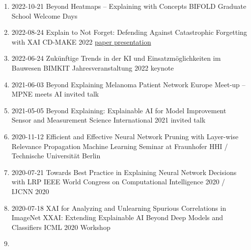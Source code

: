 \documentclass[10pt,a4paper]{article} %
\begin{document}
{
\begin{enumerate}
    \item {}
                    {2022-10-21}
                    {Beyond Heatmaps -- Explaining with Concepts}
                    {BIFOLD Graduate School Welcome Days}
    \item {}
                    {2022-08-24}
                    {Explain to Not Forget: Defending Against Catastrophic Forgetting with XAI                    }
                    {CD-MAKE 2022}
                    {\href{https://link.springer.com/chapter/10.1007/978-3-031-14463-9_1}{paper presentation}}
    \item {}
                    {2022-06-24}
                    {Zukünftige Trends in der KI und Einsatzmöglichkeiten im Bauwesen}
                    {BIMKIT Jahresveranstaltung 2022}
                    {keynote}
    \item {}
                    {2021-06-03}
                    {Beyond Explaining}
                    {Melanoma Patient Network Europe Meet-up -- MPNE meets AI }
                    {invited talk}
    \item {}
                    {2021-05-05}
                    {Beyond Explaining: Explainable AI for Model Improvement}
                    {Sensor and Measurement Science International 2021}
                    {invited talk}
    \item {}
                    {2020-11-12}
                    {Efficient and Effective Neural Network Pruning with Layer-wise Relevance Propagation}
                    {Machine Learning Seminar at Fraunhofer HHI / Technische Universität Berlin}
    \item {}
                    {2020-07-21}
                    {Towards Best Practice in Explaining Neural Network Decisions with LRP}
                    {IEEE World Congress on Computational Intelligence 2020 / IJCNN 2020}
    \item {}
                    {2020-07-18}
                    {XAI for Analyzing and Unlearning Spurious Correlations in ImageNet}
                    {XXAI: Extending Explainable AI Beyond Deep Models and Classifiers}
                    {ICML 2020 Workshop}
    \item {}

\end{enumerate}}
\end{document}
